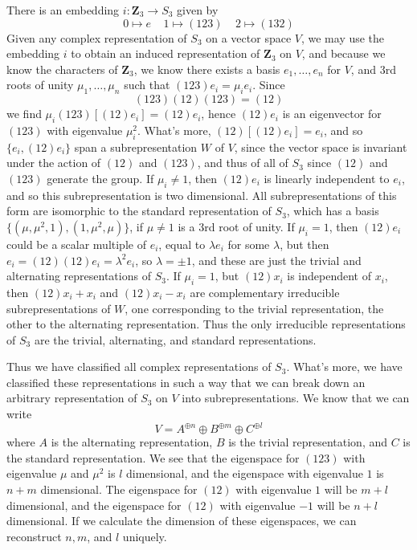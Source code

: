 \begin{example}
    There is an embedding $i: \mathbf{Z}_3 \to S_3$ given by
    \[ 0 \mapsto e\ \ \ \ \ 1 \mapsto (1 2 3)\ \ \ \ \ 2 \mapsto (1 3 2) \]
    Given any complex representation of $S_3$ on a vector space $V$, we may use the embedding $i$ to obtain an induced representation of $\mathbf{Z}_3$ on $V$, and because we know the characters of $\mathbf{Z}_3$, we know there exists a basis $e_1, \dots, e_n$ for $V$, and 3rd roots of unity $\mu_1, \dots, \mu_n$ such that $(1 2 3)e_i = \mu_i e_i$. Since
    \[ (123)(12)(123) = (12) \]
    we find $\mu_i (123)[(12)e_i] = (1 2) e_i$, hence $(1 2) e_i$ is an eigenvector for $(1 23)$ with eigenvalue $\mu_i^2$. What's more, $(1 2)[(1 2) e_i] = e_i$, and so $\{ e_i, (1 2) e_i \}$ span a subrepresentation $W$ of $V$, since the vector space is invariant under the action of $(1 2)$ and $(1 2 3)$, and thus of all of $S_3$ since $(12)$ and $(123)$ generate the group. If $\mu_i \neq 1$, then $(1 2) e_i$ is linearly independent to $e_i$, and so this subrepresentation is two dimensional. All subrepresentations of this form are isomorphic to the standard representation of $S_3$, which has a basis $\{ (\mu,\mu^2,1), (1,\mu^2,\mu) \}$, if $\mu \neq 1$ is a 3rd root of unity. If $\mu_i = 1$, then $(1 2)e_i$ could be a scalar multiple of $e_i$, equal to $\lambda e_i$ for some $\lambda$, but then $e_i = (1 2)(1 2)e_i = \lambda^2e_i$, so $\lambda = \pm 1$, and these are just the trivial and alternating representations of $S_3$. If $\mu_i = 1$, but $(1 2)x_i$ is independent of $x_i$, then $(12)x_i + x_i$ and $(12)x_i - x_i$ are complementary irreducible subrepresentations of $W$, one corresponding to the trivial representation, the other to the alternating representation. Thus the only irreducible representations of $S_3$ are the trivial, alternating, and standard representations.
\end{example}

Thus we have classified all complex representations of $S_3$. What's more, we have classified these representations in such a way that we can break down an arbitrary representation of $S_3$ on $V$ into subrepresentations. We know that we can write
%
\[ V = A^{\oplus n} \oplus B^{\oplus m} \oplus C^{\oplus l} \]
%
where $A$ is the alternating representation, $B$ is the trivial representation, and $C$ is the standard representation. We see that the eigenspace for $(123)$ with eigenvalue $\mu$ and $\mu^2$ is $l$ dimensional, and the eigenspace with eigenvalue $1$ is $n + m$ dimensional. The eigenspace for $(12)$ with eigenvalue $1$ will be $m + l$ dimensional, and the eigenspace for $(12)$ with eigenvalue $-1$ will be $n + l$ dimensional. If we calculate the dimension of these eigenspaces, we can reconstruct $n,m$, and $l$ uniquely.

